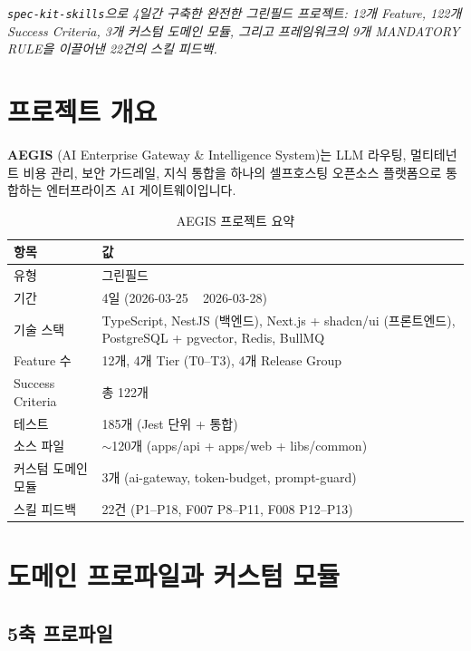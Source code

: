 \documentclass[11pt,a4paper,openright,twoside]{report}
\newcommand{\speckit}{\texttt{spec-kit-skills}}
\begin{document}
\textit{\speckit{}으로 4일간 구축한 완전한 그린필드 프로젝트: 12개 Feature, 122개 Success Criteria, 3개 커스텀 도메인 모듈, 그리고 프레임워크의 9개 MANDATORY RULE을 이끌어낸 22건의 스킬 피드백.}

\section{프로젝트 개요}

\textbf{AEGIS} (AI Enterprise Gateway \& Intelligence System)는 LLM 라우팅, 멀티테넌트 비용 관리, 보안 가드레일, 지식 통합을 하나의 셀프호스팅 오픈소스 플랫폼으로 통합하는 엔터프라이즈 AI 게이트웨이입니다.

\begin{table}[H]
\centering
\caption{AEGIS 프로젝트 요약}
\label{tab:aegis-summary-ko}
\begin{tabularx}{\textwidth}{lX}
\toprule
\textbf{항목} & \textbf{값} \\
\midrule
유형 & 그린필드 \\
기간 & 4일 (2026-03-25 ~ 2026-03-28) \\
기술 스택 & TypeScript, NestJS (백엔드), Next.js + shadcn/ui (프론트엔드), PostgreSQL + pgvector, Redis, BullMQ \\
Feature 수 & 12개, 4개 Tier (T0--T3), 4개 Release Group \\
Success Criteria & 총 122개 \\
테스트 & 185개 (Jest 단위 + 통합) \\
소스 파일 & $\sim$120개 (apps/api + apps/web + libs/common) \\
커스텀 도메인 모듈 & 3개 (ai-gateway, token-budget, prompt-guard) \\
스킬 피드백 & 22건 (P1--P18, F007 P8--P11, F008 P12--P13) \\
\bottomrule
\end{tabularx}
\end{table}

\section{도메인 프로파일과 커스텀 모듈}

\subsection{5축 프로파일}
\end{document}
